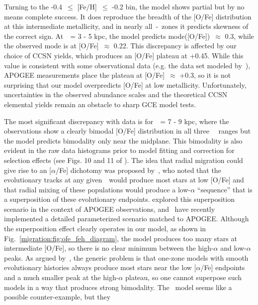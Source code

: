 \par 
Turning to the -0.4~$\leq$ [Fe/H]~$\leq$ -0.2 bin, the model shows partial but 
by no means complete success. 
It does reproduce the breadth of the [O/Fe] distribution at this intermediate 
metallicity, and in nearly all~\rgal-\absz~zones it predicts skewness of the 
correct sign. 
At~\rgal~= 3 - 5 kpc, the model predicts mode([O/Fe])~$\approx$ 0.3, while 
the observed mode is at [O/Fe]~$\approx$ 0.22. 
This discrepancy is affected by our choice of CCSN yields, which produces an 
[O/Fe] plateau at +0.45. 
While this value is consistent with some observational data (e.g. the 
\citealp*{Ramirez2013} data set modeled by~\citealp{Andrews2017}), APOGEE 
measurements place the plateau at [O/Fe]~$\approx$ +0.3, so it is not 
surprising that our model overpredicts [O/Fe] at low metallicity. 
Unfortunately, uncertainties in the observed abundance scales and the 
theoretical CCSN elemental yields remain an obstacle to sharp GCE model tests. 
\par 
The most significant discrepancy with data is for~\rgal~= 7 - 9 kpc, where the 
observations show a clearly bimodal [O/Fe] distribution in all three~\absz~ 
ranges but the model predicts bimodality only near the midplane. 
This bimodality is also evident in the raw data histograms prior to model 
fitting and correction for selection effects (see Figs. 10 and 11 of 
\citealp{Vincenzo2021a}). 
The idea that radial migration could give rise to an [$\alpha$/Fe] dichotomy 
was proposed by~\citet{Schoenrich2009a}, who noted that the evolutionary tracks 
at any given~\rgal~would produce most stars at low [O/Fe] and that radial 
mixing of these populations would produce a low-$\alpha$ ``sequence'' that is 
a superposition of these evolutionary endpoints. 
\citet{Nidever2014} explored this superposition scenario in the context of 
APOGEE observations, and~\citet{Sharma2021} have recently implemented a 
detailed parameterized scenario matched to APOGEE. 
Although the superposition effect clearly operates in our model, as shown in 
Fig.~\ref{migration:fig:ofe_feh_diagram}, the model produces too many stars at 
intermediate [O/Fe], so there is no clear minimum between the high-$\alpha$ 
and low-$\alpha$ peaks. 
As argued by~\citet{Vincenzo2021a}, the generic problem is that one-zone models 
with smooth evolutionary histories always produce most stars near the low 
[$\alpha$/Fe] endpoints and a much smaller peak at the high-$\alpha$ 
plateau, so one cannot superpose such models in a way that produces strong 
bimodality. 
The~\citet{Sharma2021} model seems like a possible counter-example, but they 
